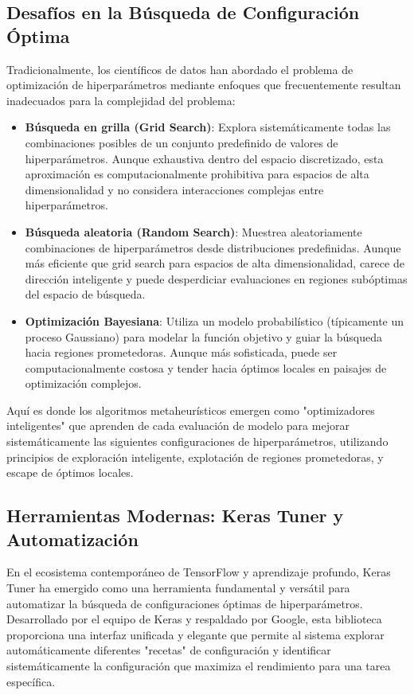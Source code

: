 \subsection{Desafíos en la Búsqueda de Configuración Óptima}

Tradicionalmente, los científicos de datos han abordado el problema de optimización de hiperparámetros mediante enfoques que frecuentemente resultan inadecuados para la complejidad del problema:

\begin{itemize}
    \item \textbf{Búsqueda en grilla (Grid Search)}: Explora sistemáticamente todas las combinaciones posibles de un conjunto predefinido de valores de hiperparámetros. Aunque exhaustiva dentro del espacio discretizado, esta aproximación es computacionalmente prohibitiva para espacios de alta dimensionalidad y no considera interacciones complejas entre hiperparámetros.
    \item \textbf{Búsqueda aleatoria (Random Search)}: Muestrea aleatoriamente combinaciones de hiperparámetros desde distribuciones predefinidas. Aunque más eficiente que grid search para espacios de alta dimensionalidad, carece de dirección inteligente y puede desperdiciar evaluaciones en regiones subóptimas del espacio de búsqueda.
    \item \textbf{Optimización Bayesiana}: Utiliza un modelo probabilístico (típicamente un proceso Gaussiano) para modelar la función objetivo y guiar la búsqueda hacia regiones prometedoras. Aunque más sofisticada, puede ser computacionalmente costosa y tender hacia óptimos locales en paisajes de optimización complejos.
\end{itemize}

Aquí es donde los algoritmos metaheurísticos emergen como "optimizadores inteligentes" que aprenden de cada evaluación de modelo para mejorar sistemáticamente las siguientes configuraciones de hiperparámetros, utilizando principios de exploración inteligente, explotación de regiones prometedoras, y escape de óptimos locales.

\subsection{Herramientas Modernas: Keras Tuner y Automatización}

En el ecosistema contemporáneo de TensorFlow y aprendizaje profundo, Keras Tuner \cite{omalley2020hyperparameter} ha emergido como una herramienta fundamental y versátil para automatizar la búsqueda de configuraciones óptimas de hiperparámetros. Desarrollado por el equipo de Keras y respaldado por Google, esta biblioteca proporciona una interfaz unificada y elegante que permite al sistema explorar automáticamente diferentes "recetas" de configuración y identificar sistemáticamente la configuración que maximiza el rendimiento para una tarea específica.


